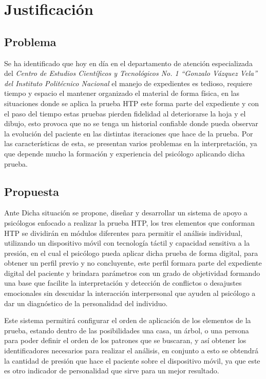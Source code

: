 \section{Justificación}

\subsection{Problema}
Se ha identificado que hoy en día en el departamento de atención especializada del \textit{Centro de Estudios Científicos y Tecnológicos No. 1 ``Gonzalo Vázquez Vela'' del Instituto Politécnico Nacional} el manejo de expedientes es tedioso, requiere tiempo y espacio el mantener organizado el material de forma física, en las situaciones donde se aplica la prueba HTP este forma parte del expediente y con el paso del tiempo estas pruebas pierden fidelidad al deteriorarse la hoja y el dibujo, esto provoca que no se tenga un historial confiable donde pueda observar la evolución del paciente en las distintas iteraciones que hace de la prueba. Por las características de esta, se presentan varios problemas en la interpretación, ya que depende mucho la formación y experiencia del psicólogo aplicando dicha prueba.

\subsection{Propuesta}
Ante Dicha situación se propone, diseñar y desarrollar un sistema de apoyo a psicólogos enfocado a realizar la prueba HTP, los tres elementos que conforman HTP se dividirán en módulos diferentes para permitir el análisis individual, utilizando un dispositivo móvil con tecnología táctil y capacidad sensitiva a la presión, en el cual el psicólogo pueda aplicar dicha prueba de forma digital, para obtener un perfil previo y no concluyente, este perfil formara parte del expediente digital del paciente y brindara parámetros con un grado de objetividad formando una base que facilite la interpretación y detección de conflictos o desajustes emocionales sin descuidar la interacción interpersonal que ayuden al psicólogo a dar un diagnóstico de la personalidad del individuo.

Este sistema permitirá configurar el orden de aplicación de los elementos de la prueba, estando dentro de las posibilidades una casa, un árbol, o una persona para poder definir el orden de los patrones que se buscaran, y así obtener los identificadores necesarios para realizar el análisis, en conjunto a esto se obtendrá la cantidad de presión que hace el paciente sobre el dispositivo móvil, ya que este es otro indicador de personalidad que sirve para un mejor resultado.

